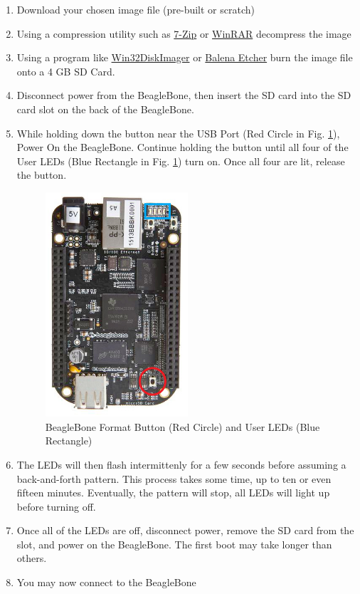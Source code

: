             \begin{enumerate}
                \item Download your chosen image file (pre-built or scratch)
                \item Using a compression utility such as \href{https://www.7-zip.org/}{7-Zip} or \href{https://www.win-rar.com/start.html?&L=0}{WinRAR} decompress the image
                \item Using a program like \href{https://win32diskimager.org/}{Win32DiskImager} or \href{https://www.balena.io/etcher/}{Balena Etcher} burn the image file onto a 4 GB SD Card.
                \item Disconnect power from the BeagleBone, then insert the SD card into the SD card slot on the back of the BeagleBone. 
                \item While holding down the button near the USB Port (Red Circle in Fig. \ref{fig:BeagleBoneButtonLED}), Power On the BeagleBone. Continue holding the button until all four of the User LEDs (Blue Rectangle in Fig. \ref{fig:BeagleBoneButtonLED}) turn on. Once all four are lit, release the button.
                    \begin{figure}[H]
                        \centering
                        \includegraphics[width=0.5\textwidth]{images/beagleboneblack_truckcape_v4_images/BeagleBoneFormatButton.png}
                        \caption{BeagleBone Format Button (Red Circle) and User LEDs (Blue Rectangle)}
                        \label{fig:BeagleBoneButtonLED}
                    \end{figure}
                \item The LEDs will then flash intermittenly for a few seconds before assuming a back-and-forth pattern. This process takes some time, up to ten or even fifteen minutes. Eventually, the pattern will stop, all LEDs will light up before turning off. 
                \item Once all of the LEDs are off, disconnect power, remove the SD card from the slot, and power on the BeagleBone. The first boot may take longer than others. 
                \item You may now connect to the BeagleBone
            \end{enumerate}
